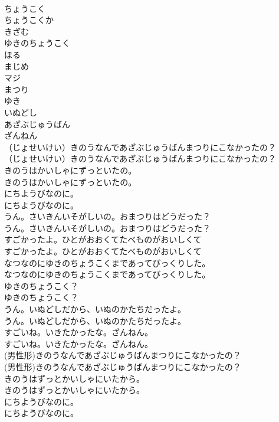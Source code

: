 \documentclass[8pt]{extreport}
\begin{document}
\begin{CJK}{UTF8}{min}
\\	ちょうこく
\\	ちょうこくか
\\	きざむ
\\	ゆきのちょうこく
\\	ほる
\\	まじめ
\\	マジ
\\	まつり
\\	ゆき
\\	いぬどし
\\	あざぶじゅうばん
\\	ざんねん
\\	（じょせいけい）きのうなんであざぶじゅうばんまつりにこなかったの？	
\\	（じょせいけい）きのうなんであざぶじゅうばんまつりにこなかったの？ 
\\	きのうはかいしゃにずっといたの。	
\\	きのうはかいしゃにずっといたの。 
\\	にちようびなのに。	
\\	にちようびなのに。 
\\	うん。さいきんいそがしいの。おまつりはどうだった？	
\\	うん。さいきんいそがしいの。おまつりはどうだった？ 
\\	すごかったよ。ひとがおおくてたべものがおいしくて	
\\	すごかったよ。ひとがおおくてたべものがおいしくて 
\\	なつなのにゆきのちょうこくまであってびっくりした。	
\\	なつなのにゆきのちょうこくまであってびっくりした。 
\\	ゆきのちょうこく？	
\\	ゆきのちょうこく？ 
\\	うん。いぬどしだから、いぬのかたちだったよ。	
\\	うん。いぬどしだから、いぬのかたちだったよ。 
\\	すごいね。いきたかったな。ざんねん。	
\\	すごいね。いきたかったな。ざんねん。 
\\	(男性形)きのうなんであざぶじゅうばんまつりにこなかったの？	
\\	(男性形)きのうなんであざぶじゅうばんまつりにこなかったの？ 
\\	きのうはずっとかいしゃにいたから。	
\\	きのうはずっとかいしゃにいたから。 
\\	にちようびなのに。	
\\	にちようびなのに。 

\end{CJK}
\end{document}
